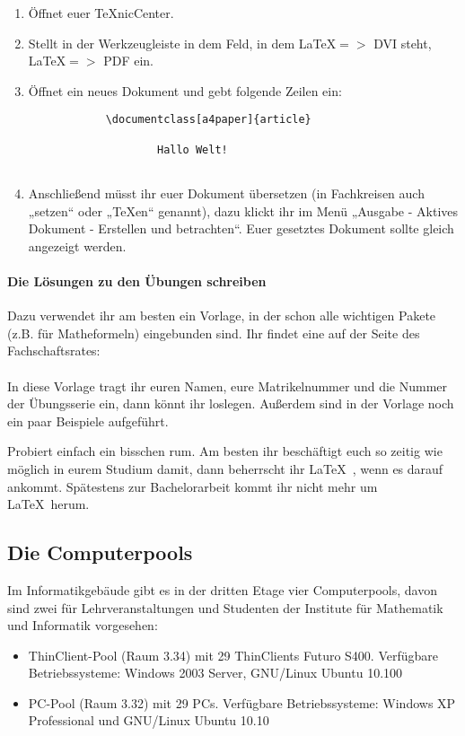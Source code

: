 \begin{enumerate}
 \item Öffnet euer \TeX nicCenter.
 \item Stellt in der Werkzeugleiste in dem Feld, in dem \LaTeX $=>$ DVI steht, \LaTeX $=>$ PDF ein.
 \item Öffnet ein neues Dokument und gebt folgende Zeilen ein:
    \begin{verbatim}
            \documentclass[a4paper]{article}
            
                    Hallo Welt!
            
    \end{verbatim}
 \item Anschließend müsst ihr euer Dokument übersetzen (in Fachkreisen auch „setzen“ oder „\TeX en“ genannt),
       dazu klickt ihr im Menü „Ausgabe - Aktives Dokument -
       Erstellen und betrachten“. Euer gesetztes Dokument sollte
       gleich angezeigt werden.
\end{enumerate}

\paragraph{Die Lösungen zu den Übungen schreiben}
Dazu verwendet ihr am besten ein Vorlage, in der schon alle wichtigen Pakete (z.B. für Matheformeln) eingebunden sind.
Ihr findet eine auf der Seite des Fachschaftsrates:\\
\\
In diese Vorlage tragt ihr euren Namen, eure Matrikelnummer und die Nummer der Übungsserie ein, dann könnt ihr loslegen.
Außerdem sind in der Vorlage noch ein paar Beispiele aufgeführt.

Probiert einfach ein bisschen rum.
Am besten ihr beschäftigt euch so zeitig wie möglich in eurem Studium damit, dann beherrscht ihr \LaTeX~, wenn es darauf ankommt.
Spätestens zur Bachelorarbeit kommt ihr nicht mehr um \LaTeX~herum.

\subsection{Die Computerpools}
Im Informatikgebäude gibt es in der dritten Etage vier Computerpools, davon sind zwei für Lehrveranstaltungen und Studenten der Institute für Mathematik und Informatik vorgesehen:

\begin{itemize}
    \item ThinClient-Pool (Raum 3.34) mit 29 ThinClients Futuro S400.
          Verfügbare Betriebssysteme: Windows 2003 Server, GNU/Linux Ubuntu 10.100
    \item PC-Pool (Raum 3.32) mit 29 PCs.
          Verfügbare Betriebssysteme: Windows XP Professional und GNU/Linux Ubuntu 10.10 
\end{itemize}

